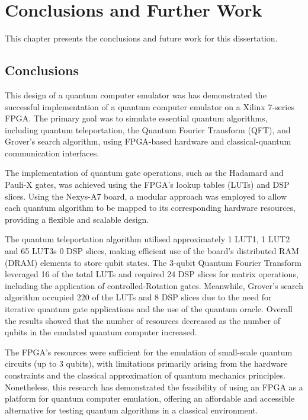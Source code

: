 \chapter{\label{ch:conclusions} Conclusions and Further Work}

This chapter presents the conclusions and future work for this dissertation.

\section{Conclusions}

This design of a quantum computer emulator was has demonstrated the successful implementation of a quantum computer emulator on a Xilinx 7-series FPGA. The primary goal was to simulate essential quantum algorithms, including quantum teleportation, the Quantum Fourier Transform (QFT), and Grover's search algorithm, using FPGA-based hardware and classical-quantum communication interfaces.

The implementation of quantum gate operations, such as the Hadamard and Pauli-X gates, was achieved using the FPGA's lookup tables (LUTs) and DSP slices. Using the Nexys-A7 board, a modular approach was employed to allow each quantum algorithm to be mapped to its corresponding hardware resources, providing a flexible and scalable design.

The quantum teleportation algorithm utilised approximately 1 LUT1, 1 LUT2 and 65 LUT3s 0 DSP slices, making efficient use of the board's distributed RAM (DRAM) elements to store qubit states. The 3-qubit Quantum Fourier Transform leveraged 16 of the total LUTs and required 24 DSP slices for matrix operations, including the application of controlled-Rotation gates. Meanwhile, Grover's search algorithm occupied 220 of the LUTs and 8 DSP slices due to the need for iterative quantum gate applications and the use of the quantum oracle. Overall the results showed that the number of resources decreased as the number of qubits in the emulated quantum computer increased.

The FPGA’s resources were sufficient for the emulation of small-scale quantum circuits (up to 3 qubits), with limitations primarily arising from the hardware constraints and the classical approximation of quantum mechanics principles. Nonetheless, this research has demonstrated the feasibility of using an FPGA as a platform for quantum computer emulation, offering an affordable and accessible alternative for testing quantum algorithms in a classical environment.

